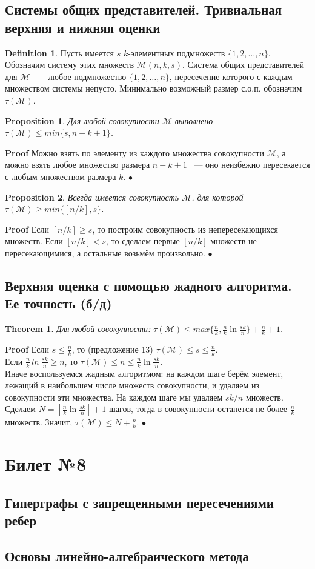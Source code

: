 \documentclass[a4paper]{article}
\theoremstyle{plain}
\newtheorem{theorem}{Theorem}
\newtheorem*{proposition-star}{Proposition}
\theoremstyle{remark}
\theoremstyle{definition}
\newtheorem*{definition-star}{Definition}
\renewenvironment{proof}{{\bfseries Proof}}{$\bullet$}
\newcommand{\class}[1]{\left[ #1 \right]} %
\newcommand{\myM}{\mathcal{M}} %
\begin{document}
\subsection{Системы общих представителей. Тривиальная верхняя и нижняя оценки}
\begin{definition-star} Пусть имеется $s$ $k$-элементных подмножеств $\{1,2,\dots,n\}$. Обозначим систему этих множеств $\myM(n,k,s)$. Система общих представителей для $\myM$ ~--- любое подмножество $\{1,2,\dots,n\}$, пересечение которого с каждым множеством системы непусто. Минимально возможный размер с.о.п. обозначим $\tau(\myM)$.
\end{definition-star}
\begin{proposition-star} Для любой совокупности $\myM$ выполнено $\tau(\myM)\leq min\{s,n-k+1\}$.
\end{proposition-star}
\begin{proof} Можно взять по элементу из каждого множества совокупности $\myM$, а можно взять любое множество размера $n-k+1$ ~--- оно неизбежно пересекается с любым множеством размера $k$.
\end{proof}
\begin{proposition-star} Всегда имеется совокупность $\myM$, для которой $\tau(\myM)\geq min\{[n/k],s\}$.
\end{proposition-star}
\begin{proof} Если $[n/k]\geq s$, то построим совокупность из непересекающихся множеств. Если $[n/k]<s$, то сделаем первые $[n/k]$ множеств не пересекающимися, а остальные возьмём произвольно.
\end{proof}
\subsection{Верхняя оценка с помощью жадного алгоритма. Ее точность (б/д)}
\begin{theorem} Для любой совокупности: $\tau(\myM)\leq max\{\frac{n}{k},\frac{n}{k}\ln \frac{sk}{n}\}+\frac{n}{k}+1$.
\end{theorem}
\begin{proof} Если $s\leq \frac{n}{k}$, то (предложение 13) $\tau(\myM)\leq s\leq \frac{n}{k}$.\\
Если $\frac{n}{k}\,ln\:\frac{sk}{n}\geq n$, то $\tau(\myM)\leq n \leq \frac{n}{k}\ln \frac{sk}{n}$.\\
Иначе воспользуемся жадным алгоритмом: на каждом шаге берём элемент, лежащий в наибольшем числе множеств совокупности, и удаляем из совокупности эти множества. На каждом шаге мы удаляем $sk/n$ множеств. Сделаем $N = \class{\frac{n}{k}\ln \frac{sk}{n}}+1$ шагов, тогда в совокупности останется не более $\frac{n}{k}$ множеств. Значит, $\tau(\myM)\leq N+\frac{n}{k}$.
\end{proof}

\section{Билет №8}
\subsection{Гиперграфы с запрещенными пересечениями ребер}
\subsection{Основы линейно-алгебраического метода}
\end{document}
